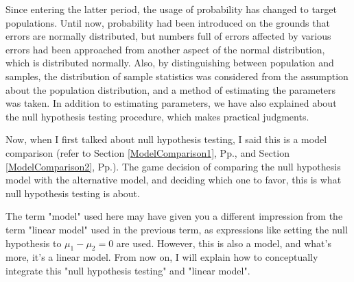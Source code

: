 \documentclass{ltjbook}
\begin{document}
Since entering the latter period, the usage of probability has changed to target populations. Until now, probability had been introduced on the grounds that errors are normally distributed, but numbers full of errors affected by various errors had been approached from another aspect of the normal distribution, which is distributed normally. Also, by distinguishing between population and samples, the distribution of sample statistics was considered from the assumption about the population distribution, and a method of estimating the parameters was taken. In addition to estimating parameters, we have also explained about the null hypothesis testing procedure, which makes practical judgments.



Now, when I first talked about null hypothesis testing, I said this is a model comparison (refer to Section \ref{ModelComparison1}, Pp.\pageref{ModelComparison1}, and Section \ref{ModelComparison2}, Pp.\pageref{ModelComparison2}). The game decision of comparing the null hypothesis model with the alternative model, and deciding which one to favor, this is what null hypothesis testing is about.

The term "model" used here may have given you a different impression from the term "linear model" used in the previous term, as expressions like setting the null hypothesis to $\mu_1 - \mu_2 =0$ are used. However, this is also a model, and what's more, it's a linear model. From now on, I will explain how to conceptually integrate this "null hypothesis testing" and "linear model".
\end{document}

